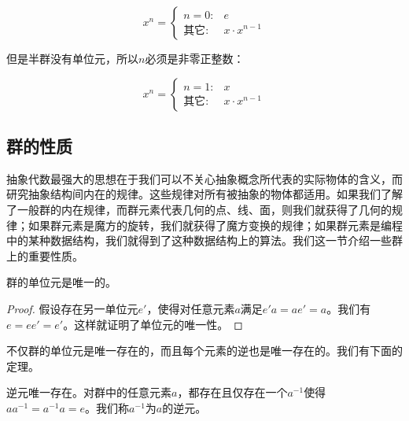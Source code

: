 \documentclass{article}
\begin{document}
\[
x^n = \left .
  \begin{cases}
  n = 0 : & e \\
  \text{其它}: & x \cdot x^{n-1}
  \end{cases}
\right .
\]

但是半群没有单位元，所以$n$必须是非零正整数：

\[
x^n = \left .
  \begin{cases}
  n = 1 : & x \\
  \text{其它}: & x \cdot x^{n-1}
  \end{cases}
\right .
\]

\begin{Exercise}
\end{Exercise}

\subsection{群的性质}

抽象代数最强大的思想在于我们可以不关心抽象概念所代表的实际物体的含义，而研究抽象结构间内在的规律。这些规律对所有被抽象的物体都适用。如果我们了解了一般群的内在规律，而群元素代表几何的点、线、面，则我们就获得了几何的规律；如果群元素是魔方的旋转，我们就获得了魔方变换的规律；如果群元素是编程中的某种数据结构，我们就得到了这种数据结构上的算法。我们这一节介绍一些群上的重要性质。

\begin{theorem}
群的单位元是唯一的。
\end{theorem}

\begin{proof}
假设存在另一单位元$e'$，使得对任意元素$a$满足$e'a = ae' = a$。我们有$e = ee'= e'$。这样就证明了单位元的唯一性。
\end{proof}

不仅群的单位元是唯一存在的，而且每个元素的逆也是唯一存在的。我们有下面的定理。

\begin{theorem}
逆元唯一存在。对群中的任意元素$a$，都存在且仅存在一个$a^{-1}$使得$aa^{-1} = a^{-1}a = e$。我们称$a^{-1}$为$a$的逆元。
\end{theorem}
\end{document}
